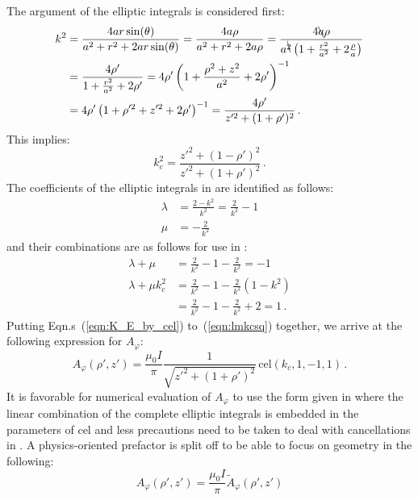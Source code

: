The argument of the elliptic integrals is considered first:
\begin{align}
  k^2 &= \frac{4 a r \sin(\theta)}{a^2 + r^2 + 2 a r \sin(\theta)}
       = \frac{4 a \rho}{a^2 + r^2 + 2 a \rho}
       = \frac{4 \bcancel{a} \rho}{a^{\bcancel{2}} \left(1 + \frac{r^2}{a^2} + 2 \frac{\rho}{a} \right)} \nonumber \\
  ~   &= \frac{4 \rho'}{1 + \frac{r^2}{a^2} + 2 \rho'}
       = 4 \rho' \left( 1 + \frac{\rho^2 + z^2}{a^2} + 2 \rho' \right)^{-1} \nonumber \\
  ~   &= 4 \rho' \left( 1 + \rho'^{2} + z'^{2} + 2 \rho' \right)^{-1}
       = \frac{4 \rho'}{z'^2 + (1 + \rho')^2} \, . \label{eqn:kSq}
\end{align}
This implies:
\begin{equation}
  k_c^2 = \frac{z'^2 + (1 - \rho')^2}{z'^2 + (1 + \rho')^2} \, . \label{eqn:kCSq_general}
\end{equation}
The coefficients of the elliptic integrals in  are identified as follows:
\begin{align}
  \lambda &= \frac{2 - k^2}{k^2} = \frac{2}{k^2} - 1 \\
  \mu     &= -\frac{2}{k^2}
\end{align}
and their combinations are as follows for use in :
\begin{align}
  \lambda + \mu       &= \frac{2}{k^2} - 1 - \frac{2}{k^2}     = -1 \\
  \lambda + \mu k_c^2 &= \frac{2}{k^2} - 1 - \frac{2}{k^2} (1 - k^2) \nonumber \\
          ~           &= \frac{2}{k^2} - 1 - \frac{2}{k^2} + 2 =  1 \label{eqn:lmkcsq} \, .
\end{align}
Putting Eqn.s~(\ref{eqn:K_E_by_cel}) to~(\ref{eqn:lmkcsq}) together, we arrive at the following expression for $A_\varphi$:
\begin{equation}
 A_\varphi(\rho', z') = \frac{\mu_0 I}{\pi}
                        \frac{1}{\sqrt{z'^2 + (1 + \rho')^2}} \,\mathrm{cel}(k_c, 1, -1, 1) \, . \label{eqn:cwl_A_phi_cel}
\end{equation}
It is favorable for numerical evaluation of $A_\varphi$ to use the form given in 
where the linear combination of the complete elliptic integrals is embedded in the parameters of cel
and less precautions need to be taken to deal with cancellations in .
A physics-oriented prefactor is split off to be able to focus on geometry in the following:
\begin{equation}
  A_\varphi(\rho', z') = \frac{\mu_0 I}{\pi} \tilde{A}_\varphi(\rho',z') \label{eqn:norm_A_phi}
\end{equation}
